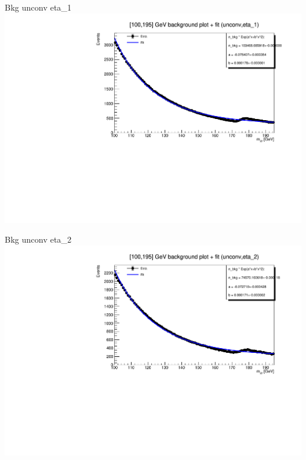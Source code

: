 \documentclass[10pt,UKenglish, leqno, xcolor = dvipsnames]{beamer}
\begin{document}
		\begin{frame}{Bkg unconv eta\_1}
			\vfill
			\includegraphics[width=1.\textwidth]{../images/week_9/bkg_100_195GeV_fit_unconv_eta_1.pdf}
			\vfill
		\end{frame}
	
		\begin{frame}{Bkg unconv eta\_2}
			\vfill
			\includegraphics[width=1.\textwidth]{../images/week_9/bkg_100_195GeV_fit_unconv_eta_2.pdf}
			\vfill
		\end{frame}
	
\end{document}
